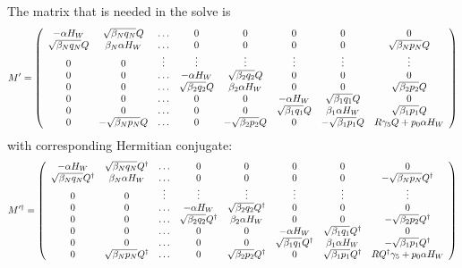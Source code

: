 \documentclass[12pt]{article}
\begin{document}
The matrix that is needed in the solve is
\begin{equation}
M' = \left( \begin{array}{cccccccc}
-\alpha H_W & \sqrt{\beta_N q_N}Q& \ldots & 0 & 0 & 0 & 0 & 0 \\
\sqrt{\beta_N q_N}Q & \beta_N \alpha H_W & \ldots & 0 & 0 & 0& 0 & \sqrt{\beta_N p_N } Q\\
 0  &  0  &  \vdots & \vdots & \vdots & \vdots & \vdots & \vdots \\
 0  &  0  & \ldots  & -\alpha H_W  & \sqrt{\beta_2 q_2}Q & 0 & 0 &  0 \\
 0  &  0  & \ldots  & \sqrt{\beta_2 q_2}Q & \beta_2 \alpha H_W & 0 & 0 & \sqrt{\beta_2 p_2}Q \\
 0  &  0  & \ldots &         0        &  0 & -\alpha H_W & \sqrt{\beta_1 q_1}Q & 0 \\
 0  &  0  & \ldots &         0        &  0 & \sqrt{\beta_1 q_1}Q & \beta_1 \alpha H_W & \sqrt{\beta_1 p_1}Q \\
 0  & -\sqrt{\beta_N p_N}Q & \ldots & 0 & -\sqrt{\beta_2 p_2}Q & 0 & -\sqrt{\beta_1 p_1} Q & R \gamma_5 Q + p_0 \alpha H_W 
\end{array} \right)
\end{equation}
with corresponding Hermitian conjugate:
\begin{equation}
M'^{\dagger} = \left( \begin{array}{cccccccc}
-\alpha H_W & \sqrt{\beta_N q_N}Q^{\dagger}& \ldots & 0 & 0 & 0 & 0 & 0 \\
\sqrt{\beta_N q_N}Q^{\dagger} & \beta_N \alpha H_W & \ldots & 0 & 0 & 0& 0 & -\sqrt{\beta_N p_N } Q^{\dagger}\\
 0  &  0  &  \vdots & \vdots & \vdots & \vdots & \vdots & \vdots \\
 0  &  0  & \ldots  & -\alpha H_W  & \sqrt{\beta_2 q_2}Q^{\dagger} & 0 & 0 &  0 \\
 0  &  0  & \ldots  & \sqrt{\beta_2 q_2}Q^{\dagger} & \beta_2 \alpha H_W & 0 & 0 & -\sqrt{\beta_2 p_2}Q^{\dagger} \\
 0  &  0  & \ldots &         0        &  0 & -\alpha H_W & \sqrt{\beta_1 q_1}Q^{\dagger} & 0 \\
 0  &  0  & \ldots &         0        &  0 & \sqrt{\beta_1 q_1}Q^{\dagger} & \beta_1 \alpha H_W & -\sqrt{\beta_1 p_1}Q^{\dagger} \\
 0  & \sqrt{\beta_N p_N}Q^{\dagger} & \ldots & 0 & \sqrt{\beta_2 p_2}Q^{\dagger} & 0 & \sqrt{\beta_1 p_1} Q^{\dagger} & R Q^{\dagger} \gamma_5 + p_0 \alpha H_W 
\end{array} \right)
\end{equation}
\end{document}
